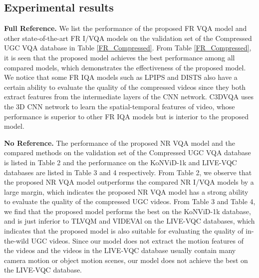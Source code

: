 \documentclass{article}
\begin{document}
\subsection{Experimental results}
\textbf{Full Reference.}
We list the performance of the proposed FR VQA model and other state-of-the-art FR I/VQA models on the validation set of the Compressed UGC VQA database in Table \ref{FR_Compressed}. From Table \ref{FR_Compressed}, it is seen that the proposed model achieves the best performance among all compared models, which demonstrates the effectiveness of the proposed model. We notice that some FR IQA models such as LPIPS and DISTS also have a certain ability to evaluate the quality of the compressed videos since they both extract features from the intermediate layers of the CNN network. C3DVQA uses the 3D CNN network to learn the spatial-temporal features of video, whose performance is superior to other FR IQA models but is interior to the proposed model. 

\textbf{No Reference.}
The performance of the proposed NR VQA model and the compared methods on the validation set of the Compressed UGC VQA database is listed in Table 2 and the performance on the KoNViD-1k and LIVE-VQC databases are listed in Table 3 and 4 respectively. From Table 2, we observe that the proposed NR VQA model outperforms the compared NR I/VQA models by a large margin, which indicates the proposed NR VQA model has a strong ability to evaluate the quality of the compressed UGC videos.
From Table 3 and Table 4, we find that the proposed model performs the best on the KoNViD-1k database, and is just inferior to TLVQM and VIDEVAl on the LIVE-VQC databases, which indicates that the proposed model is also suitable for evaluating the quality of in-the-wild UGC videos. Since our model does not extract the motion features of the videos and the videos in the LIVE-VQC database usually contain many camera motion or object motion scenes, our model does not achieve the best on the LIVE-VQC database.
\end{document}
